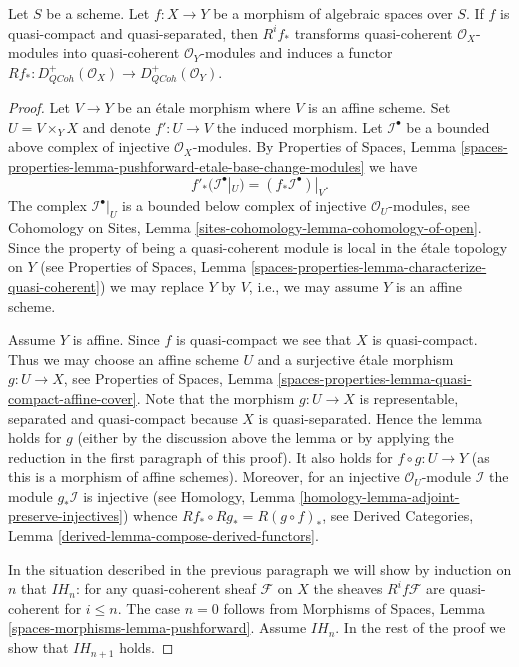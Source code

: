 \begin{lemma}
\label{lemma-higher-direct-image}
Let $S$ be a scheme. Let $f : X \to Y$ be a morphism of algebraic spaces
over $S$. If $f$ is quasi-compact and quasi-separated, then $R^if_*$
transforms quasi-coherent $\mathcal{O}_X$-modules into
quasi-coherent $\mathcal{O}_Y$-modules and induces a functor
$Rf_* : D_{QCoh}^+(\mathcal{O}_X) \to D_{QCoh}^+(\mathcal{O}_Y)$.
\end{lemma}

\begin{proof}
Let $V \to Y$ be an \'etale morphism where $V$ is an affine scheme. Set
$U = V \times_Y X$ and denote $f' : U \to V$ the induced morphism.
Let $\mathcal{I}^\bullet$ be a bounded above complex of injective
$\mathcal{O}_X$-modules. By
Properties of Spaces, Lemma
\ref{spaces-properties-lemma-pushforward-etale-base-change-modules}
we have
$$
f'_*(\mathcal{I}^\bullet|_U) = (f_*\mathcal{I}^\bullet)|_V.
$$
The complex $\mathcal{I}^\bullet|_U$ is a bounded below complex
of injective $\mathcal{O}_U$-modules, see
Cohomology on Sites, Lemma \ref{sites-cohomology-lemma-cohomology-of-open}.
Since the property of being a quasi-coherent module is local in the
\'etale topology on $Y$ (see
Properties of Spaces, Lemma
\ref{spaces-properties-lemma-characterize-quasi-coherent})
we may replace $Y$ by $V$, i.e., we may assume $Y$ is an affine scheme.

\medskip\noindent
Assume $Y$ is affine. Since $f$ is quasi-compact we see that $X$
is quasi-compact. Thus we may choose an affine scheme $U$ and a surjective
\'etale morphism $g : U \to X$, see
Properties of Spaces,
Lemma \ref{spaces-properties-lemma-quasi-compact-affine-cover}.
Note that the morphism $g : U \to X$ is representable, separated
and quasi-compact because $X$ is quasi-separated. Hence the lemma
holds for $g$ (either by the discussion above the lemma or by
applying the reduction in the first paragraph of this proof).
It also holds for $f \circ g : U \to Y$ (as this is a morphism
of affine schemes). Moreover, for an injective $\mathcal{O}_U$-module
$\mathcal{I}$ the module $g_*\mathcal{I}$ is injective (see
Homology, Lemma \ref{homology-lemma-adjoint-preserve-injectives})
whence $Rf_* \circ Rg_* = R(g \circ f)_*$, see
Derived Categories, Lemma \ref{derived-lemma-compose-derived-functors}.

\medskip\noindent
In the situation described in the previous paragraph we will show by
induction on $n$ that $IH_n$: for any quasi-coherent sheaf $\mathcal{F}$
on $X$ the sheaves $R^if\mathcal{F}$
are quasi-coherent for $i \leq n$.
The case $n = 0$ follows from
Morphisms of Spaces, Lemma \ref{spaces-morphisms-lemma-pushforward}.
Assume $IH_n$. In the rest of the proof we show that $IH_{n + 1}$ holds.


\end{proof}

